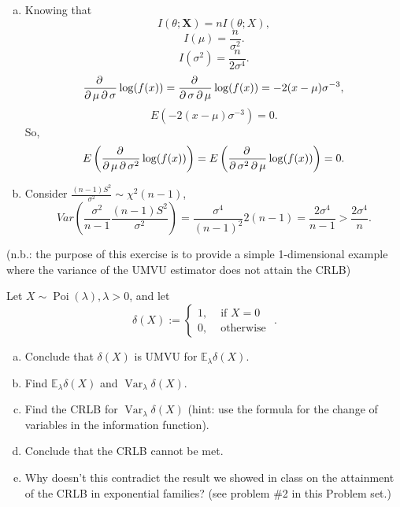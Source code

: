 \begin{solution}
    \begin{enumerate}[(a)]
        \item Knowing that 
        \[
            I(\theta;\mathbf{X})=nI(\theta;X), 
        \]
        \[
            I(\mu)=\frac{n}{\sigma^2}. 
        \]
        \[
            I(\sigma^2)=\frac{n}{2\sigma^4}. 
        \]
        \[
            \frac{\partial\,}{\partial\, \mu \,\partial\, \sigma}\log(f(x))=\frac{\partial\,}{\partial\, \sigma \,\partial\, \mu}\log(f(x))=-2(x-\mu)\sigma^{-3}, 
        \]
        \[
            E\left(-2(x-\mu)\sigma^{-3}\right)=0. 
        \]
        So, 
        \[
            E\left(\frac{\partial\,}{\partial\, \mu \,\partial\, \sigma^2}\log(f(x))\right)=E\left(\frac{\partial\,}{\partial\, \sigma^2 \,\partial\, \mu}\log(f(x))\right)=0.
        \]
        \item Consider $\frac{(n-1)S^2}{\sigma^2}\sim \chi^2
        (n-1)$, 
        \[
            Var\left(\frac{\sigma^2}{n-1}\frac{(n-1)S^2}{\sigma^2}\right)=\frac{\sigma^4}{(n-1)^2}2(n-1)=\frac{2\sigma^4}{n-1}>\frac{2\sigma^4}{n}. 
        \]
    \end{enumerate}
\end{solution}

\begin{ex}
    (n.b.: the purpose of this exercise is to provide a simple 1-dimensional example where the variance of the UMVU estimator does not attain the CRLB) 
    
    Let \(X \sim \operatorname{Poi}(\lambda), \lambda>0\), and let
    \[
        \delta(X):= \begin{cases}1, & \text { if } X=0 \\ 0, & \text { otherwise }\end{cases}. 
    \]
    \begin{enumerate}[(a)]
        \item Conclude that \(\delta(X)\) is UMVU for \(\mathbb{E}_{\lambda} \delta(X)\). 
        \item Find \(\mathbb{E}_{\lambda} \delta(X)\) and \(\operatorname{Var}_{\lambda} \delta(X)\). 
        \item Find the CRLB for \(\operatorname{Var}_{\lambda} \delta(X)\) (hint: use the formula for the change of variables in the information function). 
        \item Conclude that the CRLB cannot be met. 
        \item Why doesn't this contradict the result we showed in class on the attainment of the CRLB in exponential families? (see problem \#2 in this Problem set.)
    \end{enumerate}
\end{ex}

